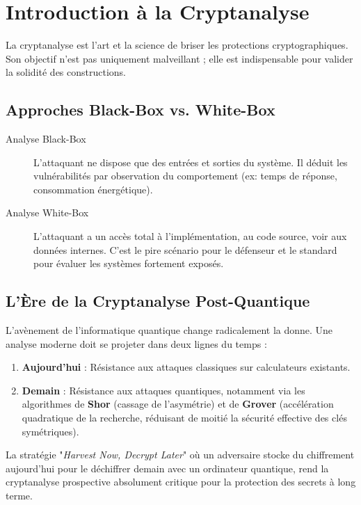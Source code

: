 \section{Introduction à la Cryptanalyse}
\label{sec:17.3}

La cryptanalyse est l'art et la science de briser les protections cryptographiques. Son objectif n'est pas uniquement malveillant ; elle est indispensable pour valider la solidité des constructions.

\subsection{Approches Black-Box vs. White-Box}
\label{subsec:17.3.1}

\begin{description}
    \item[Analyse Black-Box] L'attaquant ne dispose que des entrées et sorties du système. Il déduit les vulnérabilités par observation du comportement (ex: temps de réponse, consommation énergétique).
    \item[Analyse White-Box] L'attaquant a un accès total à l'implémentation, au code source, voir aux données internes. C'est le pire scénario pour le défenseur et le standard pour évaluer les systèmes fortement exposés.
\end{description}

\subsection{L'Ère de la Cryptanalyse Post-Quantique}
\label{subsec:17.3.2}

L'avènement de l'informatique quantique change radicalement la donne. Une analyse moderne doit se projeter dans deux lignes du temps :
\begin{enumerate}
    \item \textbf{Aujourd'hui} : Résistance aux attaques classiques sur calculateurs existants.
    \item \textbf{Demain} : Résistance aux attaques quantiques, notamment via les algorithmes de \textbf{Shor} (cassage de l'asymétrie) et de \textbf{Grover} (accélération quadratique de la recherche, réduisant de moitié la sécurité effective des clés symétriques).
\end{enumerate}

La stratégie "\textit{Harvest Now, Decrypt Later}" où un adversaire stocke du chiffrement aujourd'hui pour le déchiffrer demain avec un ordinateur quantique, rend la cryptanalyse prospective absolument critique pour la protection des secrets à long terme.